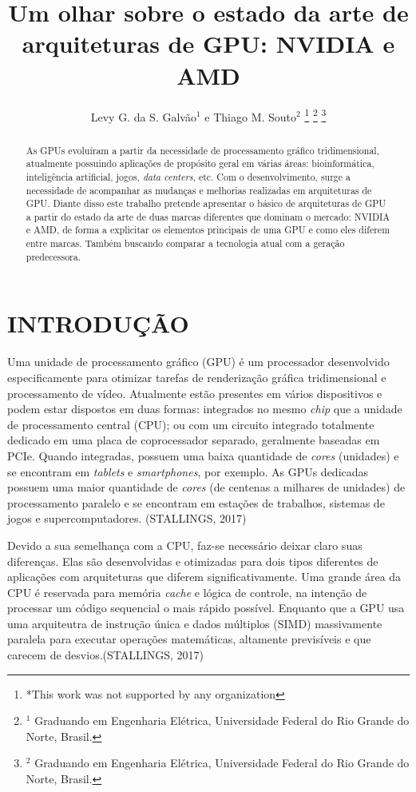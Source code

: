 \documentclass[letterpaper, 10 pt, conference]{ieeeconf}  %
\title{\LARGE \bf
Um olhar sobre o estado da arte de arquiteturas de GPU: NVIDIA e AMD
}
\author{Levy G. da S. Galvão$^{1}$ e Thiago M. Souto$^{2}$%
\thanks{*This work was not supported by any organization}%
\thanks{$^{1}$ Graduando em Engenharia Elétrica, Universidade Federal do Rio Grande do Norte, Brasil.}%
\thanks{$^{2}$ Graduando em Engenharia Elétrica, Universidade Federal do Rio Grande do Norte, Brasil.}%
}
\begin{document}
\maketitle
\thispagestyle{empty}
\pagestyle{empty}


\begin{abstract}

As GPUs evoluíram a partir da necessidade de processamento gráfico tridimensional, atualmente possuindo aplicações de propósito geral em várias áreas: bioinformática, inteligência artificial, jogos, \textit{data centers}, etc. Com o desenvolvimento, surge a necessidade de acompanhar as mudanças e melhorias realizadas em arquiteturas de GPU. Diante disso este trabalho pretende apresentar o básico de arquiteturas de GPU a partir do estado da arte de duas marcas diferentes que dominam o mercado: NVIDIA e AMD, de forma a explicitar os elementos principais de uma GPU e como eles diferem entre marcas. Também buscando comparar a tecnologia atual com a geração predecessora. 

\end{abstract}


\section{INTRODUÇÃO}

Uma unidade de processamento gráfico (GPU) é um processador desenvolvido especificamente para otimizar tarefas de renderização gráfica tridimensional e processamento de vídeo. Atualmente estão presentes em vários dispositivos e podem estar dispostos em duas formas: integrados no mesmo \textit{chip} que a unidade de processamento central (CPU); ou com um circuito integrado totalmente dedicado em uma placa de coprocessador separado, geralmente baseadas em PCIe. Quando integradas, possuem uma baixa quantidade de \textit{cores} (unidades) e se encontram em \textit{tablets} e \textit{smartphones}, por exemplo. As GPUs dedicadas possuem uma maior quantidade de \textit{cores} (de centenas a milhares de unidades) de processamento paralelo e se encontram em estações de trabalhos, sistemas de jogos e supercomputadores. (STALLINGS, 2017)

Devido a sua semelhança com a CPU, faz-se necessário deixar claro suas diferenças. Elas são desenvolvidas e otimizadas para dois tipos diferentes de aplicações com arquiteturas que diferem significativamente. Uma grande área da CPU é reservada para memória \textit{cache} e lógica de controle, na intenção de processar um código sequencial o mais rápido possível. Enquanto que a GPU usa uma arquiteutra de instrução única e dados múltiplos (SIMD) massivamente paralela para executar operações matemáticas, altamente previsíveis e que carecem de desvios.(STALLINGS, 2017)
\end{document}

